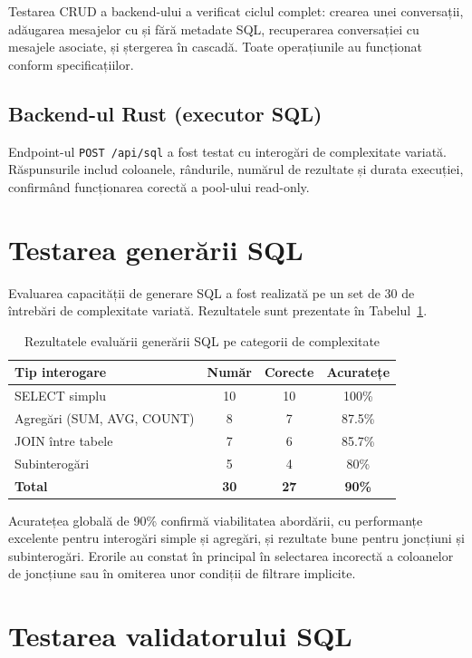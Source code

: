 \documentclass[12pt, a4paper]{report}
\newcommand{\code}[1]{\texttt{#1}}
\begin{document}
Testarea CRUD a backend-ului a verificat ciclul complet: crearea unei conversații, adăugarea mesajelor cu și fără metadate SQL, recuperarea conversației cu mesajele asociate, și ștergerea în cascadă. Toate operațiunile au funcționat conform specificațiilor.

\subsection{Backend-ul Rust (executor SQL)}

Endpoint-ul \code{POST /api/sql} a fost testat cu interogări de complexitate variată. Răspunsurile includ coloanele, rândurile, numărul de rezultate și durata execuției, confirmând funcționarea corectă a pool-ului read-only.

\section{Testarea generării SQL}

Evaluarea capacității de generare SQL a fost realizată pe un set de 30 de întrebări de complexitate variată. Rezultatele sunt prezentate în Tabelul~\ref{tab:eval_sql}.

\begin{table}[H]
\centering
\caption{Rezultatele evaluării generării SQL pe categorii de complexitate}
\label{tab:eval_sql}
\begin{tabular}{l c c c}
\toprule
\textbf{Tip interogare} & \textbf{Număr} & \textbf{Corecte} & \textbf{Acuratețe} \\
\midrule
SELECT simplu & 10 & 10 & 100\% \\
Agregări (SUM, AVG, COUNT) & 8 & 7 & 87.5\% \\
JOIN între tabele & 7 & 6 & 85.7\% \\
Subinterogări & 5 & 4 & 80\% \\
\midrule
\textbf{Total} & \textbf{30} & \textbf{27} & \textbf{90\%} \\
\bottomrule
\end{tabular}
\end{table}

Acuratețea globală de 90\% confirmă viabilitatea abordării, cu performanțe excelente pentru interogări simple și agregări, și rezultate bune pentru joncțiuni și subinterogări. Erorile au constat în principal în selectarea incorectă a coloanelor de joncțiune sau în omiterea unor condiții de filtrare implicite.

\section{Testarea validatorului SQL}
\end{document}
